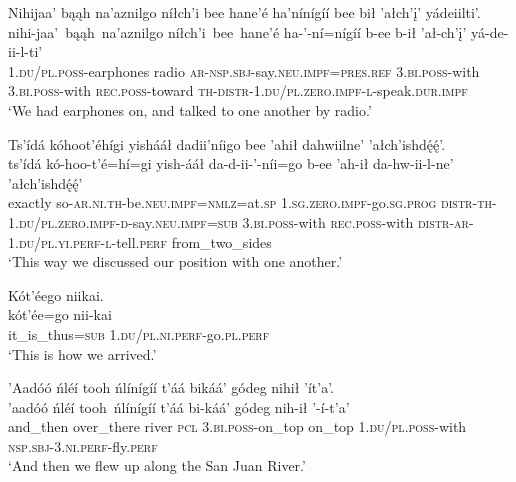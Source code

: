 \ea\label{ex:text9-3-13}
Nihijaa’ bąąh na’aznilgo níłch’i bee hane’é ha’nínígíí bee bił ’ałch’į’ yádeiilti’.\\
\gll nihi-jaa’~bąąh~{na’aznilgo}	níłch’i~bee~{hane’é}	ha-’-ní=nígíí	b-ee	b-ił	’ał-ch’į’	yá-de-ii-l-ti’\\
     1.\textsc{du}/\textsc{pl}.\textsc{poss}-earphones	radio	\textsc{ar}-\textsc{nsp}.\textsc{sbj}-say.\textsc{neu}.\textsc{impf}=\textsc{pres}.\textsc{ref}	3.\textsc{bi}.\textsc{poss}-with	3.\textsc{bi}.\textsc{poss}-with	\textsc{rec}.\textsc{poss}-toward	\textsc{th}-\textsc{distr}-1.\textsc{du}/\textsc{pl}.\textsc{zero}.\textsc{impf}-\textsc{l}-speak.\textsc{dur}.\textsc{impf}\\
\glt `We had earphones on, and talked to one another by radio.'
\z

\ea\label{ex:text9-3-14}
Ts’ídá kóhoot’éhígi yishááł dadii’níigo bee ’ahił dahwiilne’ ’ałch’ishdę́ę́’.\\
\gll ts’ídá	kó-hoo-t’é=hí=gi	yish-ááł	da-d-ii-’-níi=go	b-ee	’ah-ił	da-hw-ii-l-ne’	’ałch’ishdę́ę́’\\
     exactly	so-\textsc{ar}.\textsc{ni}.\textsc{th}-be.\textsc{neu}.\textsc{impf}=\textsc{nmlz}=at.\textsc{sp}	1.\textsc{sg}.\textsc{zero}.\textsc{impf}-go.\textsc{sg}.\textsc{prog}	\textsc{distr}-\textsc{th}-1.\textsc{du}/\textsc{pl}.\textsc{zero}.\textsc{impf}-\textsc{d}-say.\textsc{neu}.\textsc{impf}=\textsc{sub}	3.\textsc{bi}.\textsc{poss}-with	\textsc{rec}.\textsc{poss}-with	\textsc{distr}-\textsc{ar}-1.\textsc{du}/\textsc{pl}.\textsc{yi}.\textsc{perf}-\textsc{l}-tell.\textsc{perf}	from\_two\_sides\\
\glt `This way we discussed our position with one another.'
\z

\ea\label{ex:text9-3-15}
Kót’éego niikai.\\
\gll kót’ée=go	nii-kai\\
     it\_is\_thus=\textsc{sub}	1.\textsc{du}/\textsc{pl}.\textsc{ni}.\textsc{perf}-go.\textsc{pl}.\textsc{perf}\\
\glt `This is how we arrived.'
\z

\ea\label{ex:text9-3-16}
’Aadóó ńléí tooh ńlínígíí t’áá bikáá’ gódeg nihił ’ít’a’.\\
\gll ’aadóó	ńléí	tooh~{ńlínígíí}	t’áá	bi-káá’	gódeg	nih-ił	’-í-t’a’\\
     and\_then	over\_there	river	\textsc{pcl}	3.\textsc{bi}.\textsc{poss}-on\_top	on\_top	1.\textsc{du}/\textsc{pl}.\textsc{poss}-with	\textsc{nsp}.\textsc{sbj}-3.\textsc{ni}.\textsc{perf}-fly.\textsc{perf}\\
\glt `And then we flew up along the San Juan River.'
\z

